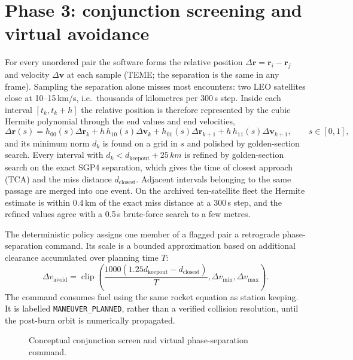 \documentclass[11pt,a4paper]{article}
\begin{document}
\section{Phase 3: conjunction screening and virtual avoidance}
For every unordered pair the software forms the relative position $\Delta\mathbf r=\mathbf r_i-\mathbf r_j$ and velocity $\Delta\mathbf v$ at each sample (TEME; the separation is the same in any frame). Sampling the separation alone misses most encounters: two LEO satellites close at 10--15\,km/s, i.e.\ thousands of kilometres per 300\,s step. Inside each interval $[t_k,t_k+h]$ the relative position is therefore represented by the cubic Hermite polynomial through the end values and end velocities,
\begin{equation}
  \Delta\mathbf r(s)=h_{00}(s)\Delta\mathbf r_k+h\,h_{10}(s)\Delta\mathbf v_k+h_{01}(s)\Delta\mathbf r_{k+1}+h\,h_{11}(s)\Delta\mathbf v_{k+1},\qquad s\in[0,1],
\end{equation}
and its minimum norm $d_k$ is found on a grid in $s$ and polished by golden-section search. Every interval with $d_k<d_{\mathrm{keepout}}+25\,km$ is refined by golden-section search on the exact SGP4 separation, which gives the time of closest approach (TCA) and the miss distance $d_{\mathrm{closest}}$. Adjacent intervals belonging to the same passage are merged into one event. On the archived ten-satellite fleet the Hermite estimate is within 0.4\,km of the exact miss distance at a 300\,s step, and the refined values agree with a 0.5\,s brute-force search to a few metres.

The deterministic policy assigns one member of a flagged pair a retrograde phase-separation command. Its scale is a bounded approximation based on additional clearance accumulated over planning time $T$:
\begin{equation}
 \Delta v_{\mathrm{avoid}}=\operatorname{clip}\left(\frac{1000\left(1.25d_{\mathrm{keepout}}-d_{\mathrm{closest}}\right)}{T},\Delta v_{\min},\Delta v_{\max}\right).
\end{equation}
The command consumes fuel using the same rocket equation as station keeping. It is labelled \texttt{MANEUVER\_PLANNED}, rather than a verified collision resolution, until the post-burn orbit is numerically propagated.

\begin{figure}[h]
\centering
{}
\caption{Conceptual conjunction screen and virtual phase-separation command.}
\end{figure}
\end{document}
